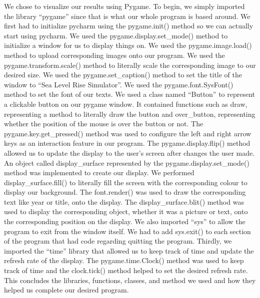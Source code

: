 \documentclass[fontsize=11pt]{article}
\begin{document}
We chose to visualize our results using Pygame. To begin, we simply imported the library “pygame” since that is what our whole program is based around. We first had to initialize pycharm using the pygame.init() method so we can actually start using pycharm. We used the pygame.display.set\_mode() method to initialize a window for us to display things on. We used the pygame.image.load() method to upload corresponding images onto our program. We used the pygame.transform.scale() method to literally scale the corresponding image to our desired size. We used the pygame.set\_caption() method to set the title of the window to “Sea Level Rise Simulator”. We used the pygame.font.SysFont() method to set the font of our texts. We used a class named “Button'' to represent a clickable button on our pygame window. It contained functions such as draw, representing a method to literally draw the button and over\_button, representing whether the position of the mouse is over the button or not. 
The pygame.key.get\_pressed() method was used to configure the left and right arrow keys as an interaction feature in our program. The pygame.display.flip() method allowed us to update the display to the user’s screen after changes the user made. An object called display\_surface represented by the pygame.display.set\_mode() method was implemented to create our display. We performed display\_surface.fill() to literally fill the screen with the corresponding colour to display our background. The font.render() was used to draw the corresponding text like year or title, onto the display. The display\_surface.blit() method was used to display the corresponding object, whether it was a picture or text, onto the corresponding position on the display. We also imported “sys” to allow the program to exit from the window itself. We had to add sys.exit() to each section of the program that had code regarding quitting the program. Thirdly, we imported the “time” library that allowed us to keep track of time and update the refresh rate of the display. The pygame.time.Clock() method was used to keep track of time and the clock.tick() method helped to set the desired refresh rate. This concludes the libraries, functions, classes, and method we used and how they helped us complete our desired program. \\
\end{document}
